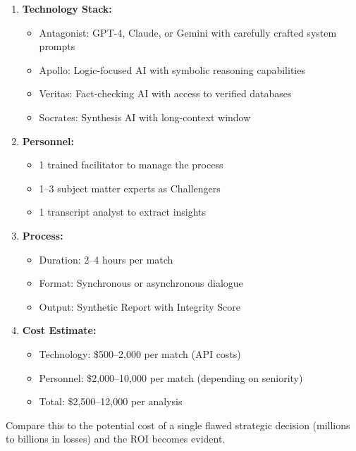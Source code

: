 \documentclass[11pt,a4paper]{article}
\begin{document}
\begin{enumerate}[leftmargin=*]
    \item \textbf{Technology Stack:}
    \begin{itemize}[nosep]
        \item Antagonist: GPT-4, Claude, or Gemini with carefully crafted system prompts
        \item Apollo: Logic-focused AI with symbolic reasoning capabilities
        \item Veritas: Fact-checking AI with access to verified databases
        \item Socrates: Synthesis AI with long-context window
    \end{itemize}
    
    \item \textbf{Personnel:}
    \begin{itemize}[nosep]
        \item 1 trained facilitator to manage the process
        \item 1--3 subject matter experts as Challengers
        \item 1 transcript analyst to extract insights
    \end{itemize}
    
    \item \textbf{Process:}
    \begin{itemize}[nosep]
        \item Duration: 2--4 hours per match
        \item Format: Synchronous or asynchronous dialogue
        \item Output: Synthetic Report with Integrity Score
    \end{itemize}
    
    \item \textbf{Cost Estimate:}
    \begin{itemize}[nosep]
        \item Technology: \$500--2,000 per match (API costs)
        \item Personnel: \$2,000--10,000 per match (depending on seniority)
        \item Total: \$2,500--12,000 per analysis
    \end{itemize}
\end{enumerate}

Compare this to the potential cost of a single flawed strategic decision (millions to billions in losses) and the ROI becomes evident.
\end{document}
